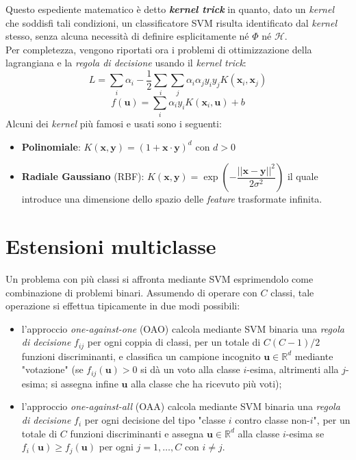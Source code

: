 Questo espediente matematico è detto \textbf{\emph{kernel trick}} in quanto, dato un \emph{kernel} che soddisfi tali condizioni, un classificatore SVM risulta identificato dal \emph{kernel} stesso, senza alcuna necessità di definire esplicitamente né $\Phi$ né $\mathcal{H}$.
\\
Per completezza, vengono riportati ora i problemi di ottimizzazione della lagrangiana e la \emph{regola di decisione} usando il \emph{kernel trick}:
\begin{equation}
\label{eq:lagrangiana_con_kernel}
L=\sum_i\alpha_i-\dfrac{1}{2}\sum_i\sum_j\alpha_i\alpha_jy_iy_jK(\mathbf{x}_i,\mathbf{x}_j)
\end{equation}
\begin{equation}
\label{eq:regola_di_decisione_con_kernel}
f(\mathbf{u})=\sum_i\alpha_iy_iK(\mathbf{x}_i,\mathbf{u})+b
\end{equation}
Alcuni dei \emph{kernel} più famosi e usati sono i seguenti:
\begin{itemize}
\item \textbf{Polinomiale}: $K(\mathbf{x},\mathbf{y})=\left (1+\mathbf{x}\cdot\mathbf{y}\right )^d$ con $d>0$
\item \textbf{Radiale Gaussiano} (RBF):  $K(\mathbf{x},\mathbf{y})=\exp\left (-\dfrac{\vert\vert\mathbf{x}-\mathbf{y}\vert\vert^2}{2\sigma^2}\right )$ il quale introduce una dimensione dello spazio delle \emph{feature} trasformate infinita.
\end{itemize}
\section{Estensioni multiclasse}
Un problema con più classi si affronta mediante SVM esprimendolo come combinazione di problemi binari. Assumendo di operare con $C$ classi, tale operazione si effettua tipicamente in due modi possibili:
\begin{itemize}
\item l'approccio \emph{one-against-one} (OAO) calcola mediante SVM binaria una \emph{regola di decisione} $f_{ij}$ per ogni coppia di classi, per un totale di $C(C-1)/2$ funzioni discriminanti, e classifica un campione incognito $\mathbf{u}\in\mathbb{R}^d$ mediante "votazione" (se $f_{ij}(\mathbf{u})>0$ si dà un voto alla classe $i$-esima, altrimenti alla $j$-esima; si assegna infine $\mathbf{u}$ alla classe che ha ricevuto più voti);
\item l'approccio \emph{one-against-all} (OAA) calcola mediante SVM binaria una \emph{regola di decisione} $f_{i}$ per ogni decisione del tipo "classe $i$ contro classe non-$i$", per un totale di $C$ funzioni discriminanti e assegna $\mathbf{u}\in\mathbb{R}^d$ alla classe $i$-esima se $f_i(\mathbf{u})\geq f_j(\mathbf{u})$ per ogni $j=1,\ldots,C$ con $i\neq j$.
\end{itemize}


